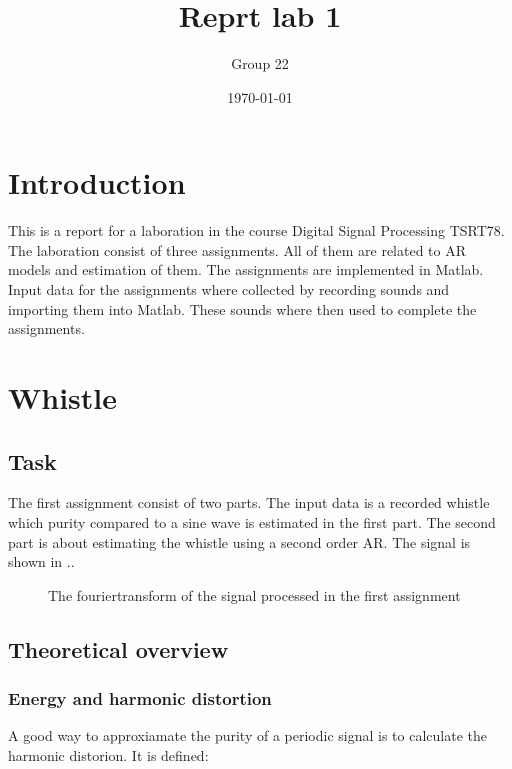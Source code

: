 \documentclass[12pt]{article}
\title{Reprt lab 1}
\author{Group 22}
\date{\today}
\begin{document}
%

\pagebreak

\maketitle

\pagebreak

\tableofcontents

\pagebreak

\section{Introduction}
This is a report for a laboration in the course Digital Signal Processing TSRT78.
The laboration consist of three assignments.
All of them are related to AR models and estimation of them.
The assignments are implemented in Matlab.
Input data for the assignments where collected by recording sounds and importing them into Matlab.
These sounds where then used to complete the assignments.

\section{Whistle}
\subsection{Task}
The first assignment consist of two parts. The input data is a recorded whistle which purity compared to a sine wave is estimated in the first part. The second part is about estimating the whistle using a second order AR. The signal is shown in .. %

\begin{figure}[H]
\centering
\caption{The fouriertransform of the signal processed in the first assignment}
\end{figure}

\subsection{Theoretical overview}

\subsubsection{Energy and harmonic distortion}
A good way to approxiamate the purity of a periodic signal is to calculate the harmonic distorion. It is defined:
\end{document}
